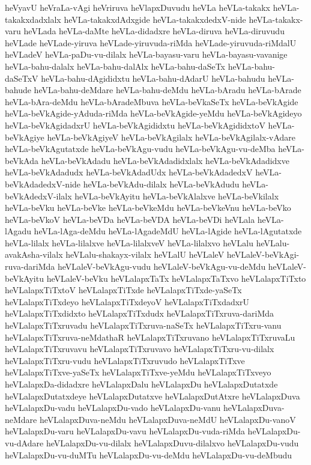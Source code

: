 {heVyavU
heVraLa-vAgi
heVriruva
heVlapxDuvudu
heVLa
heVLa-takakx
heVLa-takakxdadxlalx
heVLa-takakxdAdxgide
heVLa-takakxdedxV-nide
heVLa-takakx-varu
heVLada
heVLa-daMte
heVLa-didadxre
heVLa-diruva
heVLa-diruvudu
heVLade
heVLade-yiruva
heVLade-yiruvuda-riMda
heVLade-yiruvuda-riMdalU
heVLadeV
heVLa-paDu-vu-dilalx
heVLa-bayasu-varu
heVLa-bayasu-vavanige
heVLa-bahu-dalalx
heVLa-bahu-dalAlx
heVLa-bahu-daSeTx
heVLa-bahu-daSeTxV
heVLa-bahu-dAgididxtu
heVLa-bahu-dAdarU
heVLa-bahudu
heVLa-bahude
heVLa-bahu-deMdare
heVLa-bahu-deMdu
heVLa-bAradu
heVLa-bArade
heVLa-bAra-deMdu
heVLa-bAradeMbuva
heVLa-beVkaSeTx
heVLa-beVkAgide
heVLa-beVkAgide-yAduda-riMda
heVLa-beVkAgide-yeMdu
heVLa-beVkAgideyo
heVLa-beVkAgidadxrU
heVLa-beVkAgididxtu
heVLa-beVkAgididxtoV
heVLa-beVkAgiye
heVLa-beVkAgiyeV
heVLa-beVkAgilalx
heVLa-beVkAgilalx-vAdare
heVLa-beVkAgutatxde
heVLa-beVkAgu-vudu
heVLa-beVkAgu-vu-deMba
heVLa-beVkAda
heVLa-beVkAdadu
heVLa-beVkAdadidxlalx
heVLa-beVkAdadidxve
heVLa-beVkAdadudx
heVLa-beVkAdadUdx
heVLa-beVkAdadedxV
heVLa-beVkAdadedxV-nide
heVLa-beVkAdu-dilalx
heVLa-beVkAdudu
heVLa-beVkAdedxV-ilalx
heVLa-beVkAyitu
heVLa-beVkAlalxve
heVLa-beVkilalx
heVLa-beVku
heVLa-beVke
heVLa-beVkeMdu
heVLa-beVkeVnu
heVLa-beVko
heVLa-beVkoV
heVLa-beVDa
heVLa-beVDA
heVLa-beVDi
heVLala
heVLa-lAgadu
heVLa-lAga-deMdu
heVLa-lAgadeMdU
heVLa-lAgide
heVLa-lAgutatxde
heVLa-lilalx
heVLa-lilalxve
heVLa-lilalxveV
heVLa-lilalxvo
heVLalu
heVLalu-avakAsha-vilalx
heVLalu-shakayx-vilalx
heVLalU
heVLaleV
heVLaleV-beVkAgi-ruva-dariMda
heVLaleV-beVkAgu-vudu
heVLaleV-beVkAgu-vu-deMdu
heVLaleV-beVkAyitu
heVLaleV-beVku
heVLalapxTaTx
heVLalapxTaTxvo
heVLalapxTiTxto
heVLalapxTiTxtoV
heVLalapxTiTxde
heVLalapxTiTxde-yaSeTx
heVLalapxTiTxdeyo
heVLalapxTiTxdeyoV
heVLalapxTiTxdadxrU
heVLalapxTiTxdidxto
heVLalapxTiTxdudx
heVLalapxTiTxruva-dariMda
heVLalapxTiTxruvadu
heVLalapxTiTxruva-naSeTx
heVLalapxTiTxru-vanu
heVLalapxTiTxruva-neMdathaR
heVLalapxTiTxruvano
heVLalapxTiTxruvaLu
heVLalapxTiTxruvavu
heVLalapxTiTxruvavo
heVLalapxTiTxru-vu-dilalx
heVLalapxTiTxru-vudu
heVLalapxTiTxruvudo
heVLalapxTiTxve
heVLalapxTiTxve-yaSeTx
heVLalapxTiTxve-yeMdu
heVLalapxTiTxveyo
heVLalapxDa-didadxre
heVLalapxDalu
heVLalapxDu
heVLalapxDutatxde
heVLalapxDutatxdeye
heVLalapxDutatxve
heVLalapxDutAtxre
heVLalapxDuva
heVLalapxDu-vadu
heVLalapxDu-vado
heVLalapxDu-vanu
heVLalapxDuva-neMdare
heVLalapxDuva-neMdu
heVLalapxDuva-neMdU
heVLalapxDu-vanoV
heVLalapxDu-varu
heVLalapxDu-vavu
heVLalapxDu-vuda-riMda
heVLalapxDu-vu-dAdare
heVLalapxDu-vu-dilalx
heVLalapxDuvu-dilalxvo
heVLalapxDu-vudu
heVLalapxDu-vu-duMTu
heVLalapxDu-vu-deMdu
heVLalapxDu-vu-deMbudu
}
